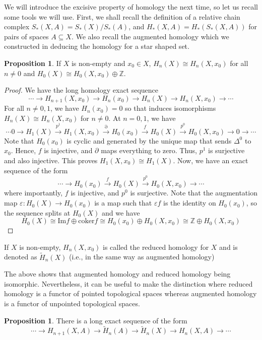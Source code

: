 \documentclass[12pt,reqno]{amsart}
\numberwithin{theorem}{section}
\theoremstyle{definition}
\theoremstyle{remark}
\numberwithin{equation}{section}
\newcommand{\Z}{\mathbb Z}
\renewcommand{\Im}{\text{Im}}
\newcommand{\del}{\partial}
\theoremstyle{definition}
\newtheorem{prop}[theorem]{Proposition}
\newcommand{\coker}{\mathrm{coker}}
\begin{document}
We will introduce the excisive property of homology the next time, so let us recall some tools we will use. First, we shall recall the definition of a relative chain complex $S_*(X,A) = S_*(X)/S_*(A)$, and $H_*(X,A)=H_*(S_*(X,A))$ for pairs of spaces $A \subseteq X$. We also recall the augmented homology which we constructed in deducing the homology for a star shaped set. 
\begin{prop}
   If $X$ is non-empty and $x_0 \in X$, $H_n(X) \cong H_n(X,x_0)$ for all $n \neq 0$ and $H_0(X) \cong H_0(X,x_0)\oplus \Z$.
\end{prop}
\begin{proof}
    We have the long homology exact sequence
    $$\cdots \rightarrow H_{n+1}(X,x_0)\rightarrow H_n(x_0) \rightarrow H_n(X) \rightarrow H_n(X,x_0) \rightarrow \cdots$$
    For all $n \neq 0,1$, we have $H_n(x_0) = 0$ so that induces isomorphisms $H_n(X) \cong H_n(X,x_0) $ for $n \neq 0$. At $n = 0,1$, we have
    $$\cdots0 \rightarrow H_1(X)\xrightarrow{p^1}  H_1(X,x_0)\xrightarrow{\del} H_0(x_0)\xrightarrow{f}  H_0(X) \xrightarrow{p^0} H_0(X,x_0) \rightarrow   0\rightarrow \cdots$$
    Note that $H_0(x_0)$ is cyclic and generated by the unique map that sends $\Delta^0$ to $x_0$. Hence, $f$ is injective, and $\del$ maps everything to zero. Thus, $p^1$ is surjective and also injective. This proves $H_1(X,x_0) \cong H_1(X)$. Now, we have an exact sequence of the form
    $$\cdots \rightarrow H_0(x_0)\xrightarrow{f}  H_0(X) \xrightarrow{p^0} H_0(X,x_0) \rightarrow   \cdots$$
    where importantly, $f$ is injective, and $p^0$ is surjective. Note that the augmentation map $\varepsilon:H_0(X) \rightarrow H_0(x_0)$ is a map such that $\varepsilon f$ is the identity on $H_0(x_0)$, so the sequence splits at $H_0(X)$ and we have 
    $$H_0(X) \cong \Im f\oplus \coker f \cong H_0(x_0) \oplus H_0(X,x_0) \cong \Z \oplus H_0(X,x_0) $$  
\end{proof}
\begin{definition}
If $X$ is non-empty, $H_n(X,x_0)$ is called the reduced homology for $X$ and is denoted as $\tilde H_n(X)$ (i.e., in the same way as augmented homology)
\end{definition}
The above shows that augmented homology and reduced homology being isomorphic. Nevertheless, it can be useful to make the distinction where reduced homology is a functor of pointed topological spaces whereas augmented homology is a functor of unpointed topological spaces. 
\begin{prop}
    There is a long exact sequence of the form 
    $$\cdots \rightarrow H_{n+1}(X,A)\rightarrow \tilde H_n(A) \rightarrow \tilde H_n(X) \rightarrow H_n(X,A) \rightarrow \cdots$$
\end{prop}
\end{document}
